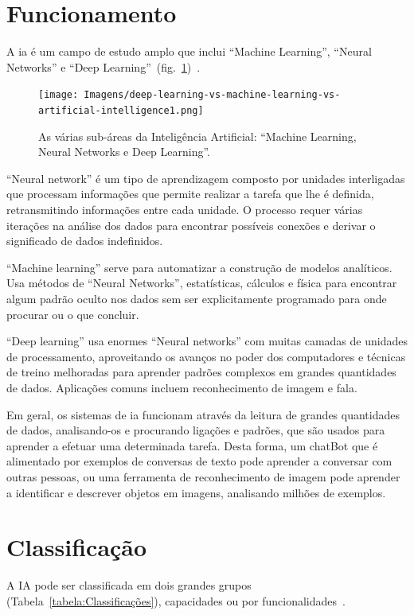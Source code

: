 \documentclass{report}
\begin{document}
\section{Funcionamento}
\label{sec.funcionamento}
A \ac{ia} é um campo de estudo amplo que inclui ``Machine Learning'', ``Neural Networks'' e ``Deep Learning''~(fig.~\ref{fig:AI})~\cite{SAS:2022}.

\begin{figure}
    \centering
    \texttt{[image: Imagens/deep-learning-vs-machine-learning-vs-artificial-intelligence1.png]}
    \caption{As várias sub-áreas da Inteligência Artificial: ``Machine Learning, Neural Networks e Deep Learning''.}
    \label{fig:AI}
\end{figure}

``Neural network'' é um tipo de aprendizagem composto por unidades interligadas que processam informações que permite realizar a tarefa que lhe é definida, retransmitindo informações entre cada unidade. O processo requer várias iterações na análise dos dados para encontrar possíveis conexões e derivar o significado de dados indefinidos.

``Machine learning'' serve para automatizar a construção de modelos analíticos. Usa métodos de ``Neural Networks'', estatísticas, cálculos e física para encontrar algum padrão oculto nos dados sem ser explicitamente programado para onde procurar ou o que concluir.

``Deep learning'' usa enormes ``Neural networks'' com muitas camadas de unidades de processamento, aproveitando os avanços no poder dos computadores e técnicas de treino melhoradas para aprender padrões complexos em grandes quantidades de dados. Aplicações comuns incluem reconhecimento de imagem e fala.

Em geral, os sistemas de \ac{ia} funcionam através da leitura de grandes quantidades de dados, analisando-os e procurando ligações e padrões, que são usados para aprender a efetuar uma determinada tarefa. Desta forma, um chatBot que é alimentado por exemplos de conversas de texto pode aprender a conversar com outras pessoas, ou uma ferramenta de reconhecimento de imagem pode aprender a identificar e descrever objetos em imagens, analisando milhões de exemplos.

\section{Classificação}
\label{sec.classificação}
A IA pode ser classificada em dois grandes grupos (Tabela~\ref{tabela:Classificações}), capacidades ou por funcionalidades~\cite{COGNITIVEWORLD:2019}.
\end{document}
